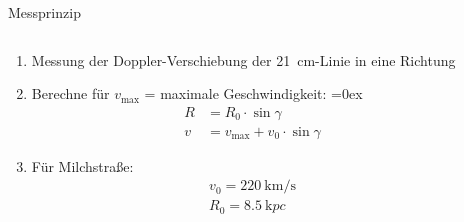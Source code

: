 \begin{frame}{Messprinzip}
  \begin{columns}[c, onlytextwidth]
    \begin{column}{0.47\textwidth}
      \begin{enumerate}
        \item Messung der Doppler-Verschiebung der \SI{21}{\centi\meter}-Linie
          in eine Richtung
        \item Berechne für $v_{\max}$ = maximale Geschwindigkeit:
          \belowdisplayskip=0ex
          \begin{align*}
            R &= R_0 \cdot \sin{γ} \\
            v &= v_{\max} + v_0 \cdot \sin{γ} 
          \end{align*}
        \item Für Milchstraße:
          \begin{align*}
            v_0 = \SI{220}{\kilo\meter\per\second} \\
          R_0 = \SI{8.5}{\kilo pc}
          \end{align*}
      \end{enumerate}
    \end{column}
    \begin{column}{0.47\textwidth}
      
    \end{column}
  \end{columns}
\end{frame}

